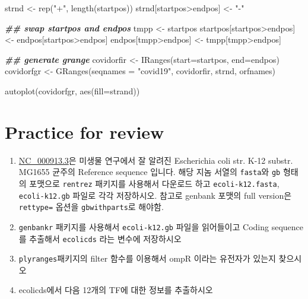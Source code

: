 \documentclass[
]{book}
\newenvironment{Shaded}{\begin{snugshade}}{\end{snugshade}}
\newcommand{\AttributeTok}[1]{\textcolor[rgb]{0.77,0.63,0.00}{#1}}
\newcommand{\DocumentationTok}[1]{\textcolor[rgb]{0.56,0.35,0.01}{\textbf{\textit{#1}}}}
\newcommand{\FunctionTok}[1]{\textcolor[rgb]{0.00,0.00,0.00}{#1}}
\newcommand{\NormalTok}[1]{#1}
\newcommand{\OtherTok}[1]{\textcolor[rgb]{0.56,0.35,0.01}{#1}}
\newcommand{\SpecialCharTok}[1]{\textcolor[rgb]{0.00,0.00,0.00}{#1}}
\newcommand{\StringTok}[1]{\textcolor[rgb]{0.31,0.60,0.02}{#1}}
\begin{document}
\begin{Shaded}
\begin{Highlighting}[]
\NormalTok{strnd }\OtherTok{\textless{}{-}} \FunctionTok{rep}\NormalTok{(}\StringTok{"+"}\NormalTok{, }\FunctionTok{length}\NormalTok{(startpos))}
\NormalTok{strnd[startpos}\SpecialCharTok{\textgreater{}}\NormalTok{endpos] }\OtherTok{\textless{}{-}} \StringTok{"{-}"}

\DocumentationTok{\#\# swap startpos and endpos }
\NormalTok{tmpp }\OtherTok{\textless{}{-}}\NormalTok{ startpos}
\NormalTok{startpos[startpos}\SpecialCharTok{\textgreater{}}\NormalTok{endpos] }\OtherTok{\textless{}{-}}\NormalTok{ endpos[startpos}\SpecialCharTok{\textgreater{}}\NormalTok{endpos]}
\NormalTok{endpos[tmpp}\SpecialCharTok{\textgreater{}}\NormalTok{endpos] }\OtherTok{\textless{}{-}}\NormalTok{ tmpp[tmpp}\SpecialCharTok{\textgreater{}}\NormalTok{endpos]}

\DocumentationTok{\#\# generate grange }
\NormalTok{covidorfir }\OtherTok{\textless{}{-}} \FunctionTok{IRanges}\NormalTok{(}\AttributeTok{start=}\NormalTok{startpos, }\AttributeTok{end=}\NormalTok{endpos)}
\NormalTok{covidorfgr }\OtherTok{\textless{}{-}} \FunctionTok{GRanges}\NormalTok{(}\AttributeTok{seqnames =} \StringTok{"covid19"}\NormalTok{, covidorfir, strnd, orfnames)}

\FunctionTok{autoplot}\NormalTok{(covidorfgr, }\FunctionTok{aes}\NormalTok{(}\AttributeTok{fill=}\NormalTok{strand))}
\end{Highlighting}
\end{Shaded}

\hypertarget{day4-exercise}{%
\chapter{Practice for review}\label{day4-exercise}}

\begin{enumerate}
\def\labelenumi{\arabic{enumi})}
\item
  \href{https://www.ncbi.nlm.nih.gov/nuccore/NC_000913.3}{NC\_000913.3}은 미생물 연구에서 잘 알려진 Escherichia coli str. K-12 substr. MG1655 균주의 Reference sequence 입니다. 해당 지놈 서열의 \texttt{fasta}와 \texttt{gb} 형태의 포맷으로 \texttt{rentrez} 패키지를 사용해서 다운로드 하고 \texttt{ecoli-k12.fasta}, \texttt{ecoli-k12.gb} 파일로 각각 저장하시오. 참고로 genbank 포맷의 full version은 \texttt{rettype=} 옵션을 \texttt{gbwithparts}로 해야함.
\item
  \texttt{genbankr} 패키지를 사용해서 \texttt{ecoli-k12.gb} 파일을 읽어들이고 Coding sequence 를 추출해서 \texttt{ecolicds} 라는 변수에 저장하시오
\item
  \texttt{plyranges}패키지의 filter 함수를 이용해서 ompR 이라는 유전자가 있는지 찾으시오
\item
  ecolicds에서 다음 12개의 TF에 대한 정보를 추출하시오
\end{enumerate}
\end{document}

